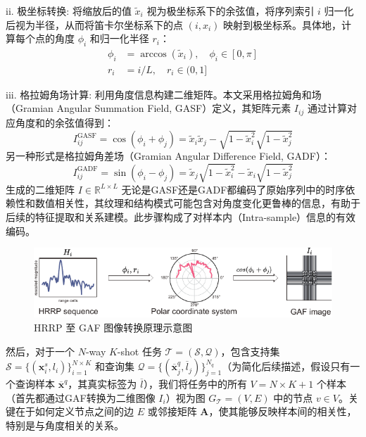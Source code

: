 ii.  极坐标转换: 将缩放后的值 $\tilde{x}_i$ 视为极坐标系下的余弦值，将序列索引 $i$ 归一化后视为半径，从而将笛卡尔坐标系下的点 $(i, x_i)$ 映射到极坐标系。具体地，计算每个点的角度 $\phi_i$ 和归一化半径 $r_i$：
    \begin{align}
        \phi_i &= \arccos(\tilde{x}_i), \quad \phi_i \in [0, \pi] \label{eq:gaf_angle} \\
        r_i &= i / L, \quad r_i \in (0, 1] \label{eq:gaf_radius}
    \end{align}
    
iii.  格拉姆角场计算: 利用角度信息构建二维矩阵。本文采用格拉姆角和场（Gramian Angular Summation Field, GASF）定义，其矩阵元素 $I_{ij}$ 通过计算对应角度和的余弦值得到：
    \begin{equation}
        I_{ij}^{\text{GASF}} = \cos(\phi_i + \phi_j) = \tilde{x}_i \tilde{x}_j - \sqrt{1-\tilde{x}_i^2} \sqrt{1-\tilde{x}_j^2}
        \label{eq:gaf_gasf}
    \end{equation}
    另一种形式是格拉姆角差场（Gramian Angular Difference Field, GADF）：
    \begin{equation}
        I_{ij}^{\text{GADF}} = \sin(\phi_i - \phi_j) = \tilde{x}_j \sqrt{1-\tilde{x}_i^2} - \tilde{x}_i \sqrt{1-\tilde{x}_j^2}
        \label{eq:gaf_gadf}
    \end{equation}
    生成的二维矩阵 $I \in \mathbb{R}^{L \times L}$ 无论是GASF还是GADF都编码了原始序列中的时序依赖性和数值相关性，其纹理和结构模式可能包含对角度变化更鲁棒的信息，有助于后续的特征提取和关系建模。此步骤构成了对样本内（Intra-sample）信息的有效编码。

\begin{figure}[h]
    \centering
    \includegraphics[width=0.8\linewidth]{figures/gaf.pdf}
    \caption{HRRP 至 GAF 图像转换原理示意图}
    \label{fig:dataset_chap3}
\end{figure}

然后，对于一个 $N$-way $K$-shot 任务 $\mathcal{T} = (\mathcal{S}, \mathcal{Q})$，包含支持集 $\mathcal{S} = \{(\mathbf{x}_i^s, l_i)\}_{i=1}^{N \times K}$ 和查询集 $\mathcal{Q} = \{(\overline{\mathbf{x}}_j^q, \overline{l}_j)\}_{j=1}^{N_q}$（为简化后续描述，假设只有一个查询样本 $\overline{\mathbf{x}}^q$，其真实标签为 $\overline{l}$），我们将任务中的所有 $V = N \times K + 1$ 个样本（首先都通过GAF转换为二维图像 $I_i$）视为图 $G_{\mathcal{T}} = (V, E)$ 中的节点 $v \in V$。关键在于如何定义节点之间的边 $E$ 或邻接矩阵 $\mathbf{A}$，使其能够反映样本间的相关性，特别是与角度相关的关系。

